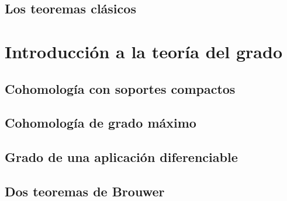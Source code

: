 \documentclass[12pt,a4paper]{book}
\theoremstyle{definition} \newtheorem{defn}[thm]{Definición}
\theoremstyle{definition} \newtheorem{ejemplo}[thm]{Ejemplo}
\theoremstyle{definition} \newtheorem{ejercicio}[thm]{Ejercicio}
\theoremstyle{remark} \newtheorem*{obs}{Observación}
\begin{document}
	  \section{Los teoremas clásicos}
	  \chapter{Introducción a la teoría del grado}
	  \section{Cohomología con soportes compactos}
	  \section{Cohomología de grado máximo}
	  \section{Grado de una aplicación diferenciable}
	  \section{Dos teoremas de Brouwer}

		      
\end{document}
